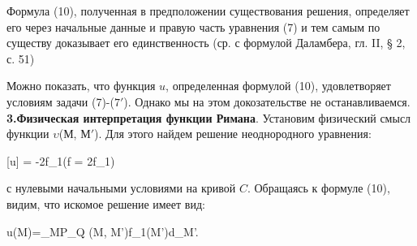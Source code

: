 \documentclass{article}
\begin{document}
Формула (10), полученная в предположении существования решения, определяет его через начальные данные и правую часть уравнения (7) и тем самым по существу доказывает его единственность (ср. с формулой Даламбера, гл. II, § 2, с. 51)

Можно показать, что функция $u$, определенная формулой (10), удовлетворяет условиям задачи (7)-($7'$). Однако мы на этом докозательстве не останавливаемся.\\
\textbf{3.Физическая интерпретация функции Римана}. Установим физический смысл функции $\upsilon$(М, М$'$). Для этого найдем решение неоднородного уравнения:
\begin{center}
  [u] = -2f_1\quad(f = 2f_1)\\
\end{center}

с нулевыми начальными условиями на кривой $C$. Обращаясь к формуле (10), видим, что искомое решение имеет вид:\\
\begin{center}
    u(M)=\int\limits_{MP}\int\limits_{Q} \upsilon(M, M')f_1(M')d\sigma_{M'}.\\
\end{center}


\maketitle
\end{document}
